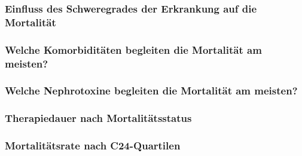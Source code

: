 \documentclass[10pt, aspectratio=169]{beamer}
\begin{document}
\begin{frame}
    \frametitle{Einfluss des Schweregrades der Erkrankung auf die Mortalität}
\end{frame}

\begin{frame}
    \frametitle{Welche Komorbiditäten begleiten die Mortalität am meisten?}
\end{frame}

\begin{frame}
    \frametitle{Welche Nephrotoxine begleiten die Mortalität am meisten?}
\end{frame}

\begin{frame}
    \frametitle{Therapiedauer nach Mortalitätsstatus}
\end{frame}

\begin{frame}
    \frametitle{Mortalitätsrate nach C24-Quartilen}
\end{frame}
\end{document}

